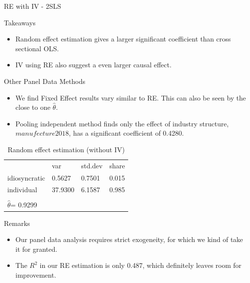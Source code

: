 \documentclass[compress]{beamer}
\begin{document}
\begin{frame}{RE with IV - 2SLS}
\begin{table}[!htbp]
      \end{table}
\end{frame}

\begin{frame}{Takeaways}
  \begin{itemize}
    \item Random effect estimation gives a larger significant coefficient than cross sectional OLS.
    \item IV using RE also suggest a even larger causal effect.
  \end{itemize}
  
\end{frame}

\begin{frame}{Other Panel Data Methods}
  \begin{itemize}
    \item We find Fixed Effect results vary similar to RE. This can also be seen by the close to one $\hat{\theta}$.
    \item Pooling independent method finds only the effect of industry structure, $manufecture2018$, has a significant coefficient of 0.4280. 
  \end{itemize}
  \begin{table}[]
    \begin{tabular}{llll}
                  & var     & std.dev & share \\
    idiosyncratic & 0.5627  & 0.7501  & 0.015 \\
    individual    & 37.9300 & 6.1587  & 0.985 \\ \hline \\[-1.8ex]
    $\hat{\theta}$= 0.9299 &         &         &      
    \end{tabular}
    \caption{Random effect estimation (without IV)}
    \label{tab: REeffect}
    \end{table}
\end{frame}

\begin{frame}{Remarks}
  \begin{itemize}
    \item Our panel data analysis requires strict exogeneity, for which we kind of take it for granted.
    \item The $R^2$ in our RE estimation is only 0.487, which definitely leaves room for improvement.
  \end{itemize}
  
\end{frame}
\end{document}
